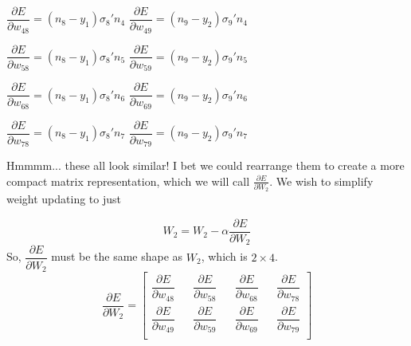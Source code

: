 \documentclass{article}
\begin{document}
\begin{center}
\qquad $\dfrac{\partial E}{\partial w_{48}} = (n_8-y_1)\sigma_8'n_4$
\qquad $\dfrac{\partial E}{\partial w_{49}} = (n_9-y_2)\sigma_9'n_4$

\end{center}

\begin{center}
\qquad $\dfrac{\partial E}{\partial w_{58}} = (n_8-y_1)\sigma_8'n_5$
\qquad $\dfrac{\partial E}{\partial w_{59}} = (n_9-y_2)\sigma_9'n_5$
\end{center}

\begin{center}
\qquad $\dfrac{\partial E}{\partial w_{68}} = (n_8-y_1)\sigma_8'n_6$
\qquad $\dfrac{\partial E}{\partial w_{69}} = (n_9-y_2)\sigma_9'n_6$
\end{center}

\begin{center}
\qquad $\dfrac{\partial E}{\partial w_{78}} = (n_8-y_1)\sigma_8'n_7$
\qquad $\dfrac{\partial E}{\partial w_{79}} = (n_9-y_2)\sigma_9'n_7$
\end{center}


Hmmmm... these all look similar! I bet we could rearrange them to create a more compact matrix representation, which we will call $\frac{\partial E}{\partial W_2}$. We wish to simplify weight updating to just

\[W_2 = W_2 - \alpha\dfrac{\partial E}{\partial W_2}\]
So, $\dfrac{\partial E}{\partial W_2}$ must be the same shape as $W_2$, which is $2 \times 4$.
\renewcommand{\arraystretch}{2.5}
\[
\dfrac{\partial E}{\partial W_2} =
\begin{bmatrix}
    \dfrac{\partial E}{\partial w_{48}} && \dfrac{\partial E}{\partial w_{58}}  && \dfrac{\partial E}{\partial w_{68}}  && \dfrac{\partial E}{\partial w_{78}} \\
    \dfrac{\partial E}{\partial w_{49}} && \dfrac{\partial E}{\partial w_{59}}  && \dfrac{\partial E}{\partial w_{69}}  && \dfrac{\partial E}{\partial w_{79}} \\
\end{bmatrix}
\]
\renewcommand{\arraystretch}{1}
\end{document}
